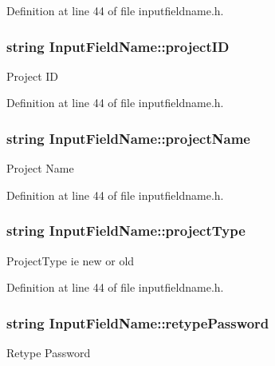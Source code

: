 Definition at line 44 of file inputfieldname.\-h.

\hypertarget{classInputFieldName_ac4bd117f3137956473f1a1d5ce9106a5}{
\subsubsection[{project\-I\-D}]{\setlength{\rightskip}{0pt plus 5cm}string Input\-Field\-Name\-::project\-I\-D}}\label{classInputFieldName_ac4bd117f3137956473f1a1d5ce9106a5}
Project I\-D 

Definition at line 44 of file inputfieldname.\-h.

\hypertarget{classInputFieldName_ab93b034743570810afe89aea88a7bbf6}{
\subsubsection[{project\-Name}]{\setlength{\rightskip}{0pt plus 5cm}string Input\-Field\-Name\-::project\-Name}}\label{classInputFieldName_ab93b034743570810afe89aea88a7bbf6}
Project Name 

Definition at line 44 of file inputfieldname.\-h.

\hypertarget{classInputFieldName_aaa398a603dfe98f4eca022ec9d90bc09}{
\subsubsection[{project\-Type}]{\setlength{\rightskip}{0pt plus 5cm}string Input\-Field\-Name\-::project\-Type}}\label{classInputFieldName_aaa398a603dfe98f4eca022ec9d90bc09}
Project\-Type ie new or old 

Definition at line 44 of file inputfieldname.\-h.

\hypertarget{classInputFieldName_acd50095ae8540a735bcd5787b904b06c}{
\subsubsection[{retype\-Password}]{\setlength{\rightskip}{0pt plus 5cm}string Input\-Field\-Name\-::retype\-Password}}\label{classInputFieldName_acd50095ae8540a735bcd5787b904b06c}
Retype Password 

